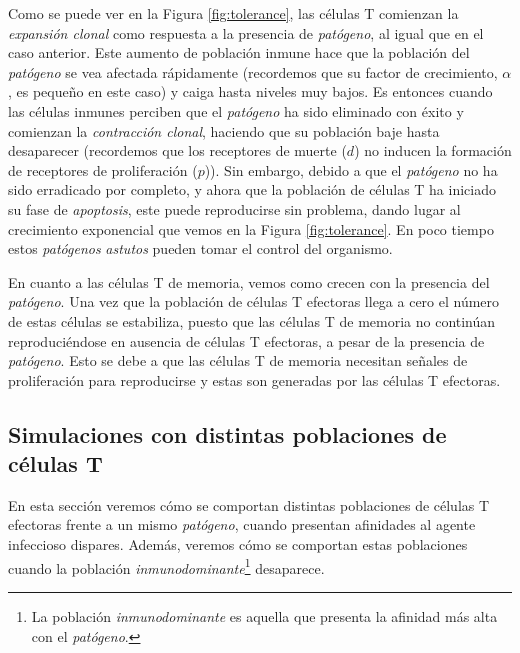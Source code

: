 Como se puede ver en la Figura \ref{fig:tolerance}, las células T comienzan la \textit{expansión clonal} como respuesta a la presencia de \textit{patógeno}, al igual que en el caso anterior. Este aumento de población inmune hace que la población del \textit{patógeno} se vea afectada rápidamente (recordemos que su factor de crecimiento, $\alpha$, es pequeño en este caso) y caiga hasta niveles muy bajos. Es entonces cuando las células inmunes perciben que el \textit{patógeno} ha sido eliminado con éxito y comienzan la \textit{contracción clonal}, haciendo que su población baje hasta desaparecer (recordemos que los receptores de muerte ($d$) no inducen la formación de receptores de proliferación ($p$)). Sin embargo, debido a que el \textit{patógeno} no ha sido erradicado por completo, y ahora que la población de células T ha iniciado su fase de \textit{apoptosis}, este puede reproducirse sin problema, dando lugar al crecimiento exponencial que vemos en la Figura \ref{fig:tolerance}. En poco tiempo estos \textit{patógenos} \textit{astutos} pueden tomar el control del organismo. 

En cuanto a las células T de memoria, vemos como crecen con la presencia del \textit{patógeno}. Una vez que la población de células T efectoras llega a cero el número de estas células se estabiliza, puesto que las células T de memoria no continúan reproduciéndose en ausencia de células T efectoras, a pesar de la presencia de \textit{patógeno}. Esto se debe a que las células T de memoria necesitan señales de proliferación para reproducirse y estas son generadas por las células T efectoras. 


\subsection{Simulaciones con distintas poblaciones de células T}
\label{sim:difPoblacionesT}

En esta sección veremos cómo se comportan distintas poblaciones de células T efectoras frente a un mismo \textit{patógeno}, cuando presentan afinidades al agente infeccioso dispares. Además, veremos cómo se comportan estas poblaciones cuando la población \textit{inmunodominante}\footnote{La población \textit{inmunodominante} es aquella que presenta la afinidad más alta con el \textit{patógeno}.} desaparece.

